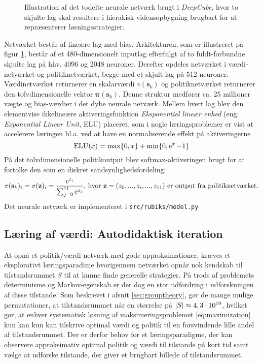 \documentclass[../main.tex]{subfiles}
\begin{document}
\begin{figure}[H]
	\centering

\caption{Illustration af det todelte neurale netværk brugt i \textit{DeepCube}, hvor to skjulte lag skal resultere i hierakisk vidensopbygning brugbart for at repræsenterer løsningsstrategier.}
\label{fig:DNN}
\end{figure}
\noindent Netværket består af lineære lag med bias.  Arkitekturen, som er illustreret på figur \ref{fig:DNN}, består af et 480-dimensionelt inputlag efterfulgt af to fuldt-forbundne skjulte lag på hhv. 4096 og 2048 neuroner. Derefter opdeles netværket i værdi-netværket og politiknetværket, begge med et skjult lag på 512 neuroner. Værdinetværket returnerer en skalarværdi \(v(\mathbf s_k)\) og politiknetværket returnerer den tolvdimensionelle vektor \(\bm \pi (\mathbf s_k)\). Denne struktur medfører ca. 25 millioner vægte og bias-værdier i det dybe neurale netværk. Mellem hvert lag blev den elementvise ikkelineære aktiveringsfunktion \textit{Eksponentiel lineær enhed} (eng: \textit{Exponential Linear Unit}, ELU) placeret, som i nogle læringsproblemer er vist at accelerere læringen bl.a. ved at have en normaliserende effekt på aktiveringerne \cite{ELU} 
\[
\operatorname{ELU}(x) = \operatorname*{max}\{0, x\} + \operatorname{min}\{0, \operatorname{e}^{x} -1\}
\]
På det tolvdimensionelle politikoutput blev softmax-aktiveringen brugt for at fortolke den som en diskret sandsynlighedsfordeling:
\[
\pi(\mathbf s_k)_i = \sigma(\mathbf z)_i = \frac{\operatorname{e}^{z_i}}{\sum_{j=0}^{11} \operatorname{e}^{z_j}} \text{, hvor \(\mathbf z=(z_0, ..., z_i, ..., z_{11})\) er output fra politiknetværket.}
\]
Det neurale netværk er implementeret i \texttt{src/rubiks/model.py}
\subsection*{Læring af værdi: Autodidaktisk iteration}
At opnå et politik/værdi-netværk med gode approksimationer, kræves et eksplorativt læringsparadime hvorigennem netværket opnår nok kendskab til tilstandsrummet \(S\) til at kunne finde generelle strategier. 
På trods af problemets determinisme og Markov-egenskab er der dog en stor udfordring i udforskningen af disse tilstande.
Som beskrevet i afsnit \ref{sec:grouptheory}, gør de mange mulige permutationer, at tilstandsrummet når en størrelse på \(|S|\approx 4,3\cdot10^{19}\), hvilket gør, at enhver systematisk løsning af maksimeringsproblemet \ref{eq:maximization} kun kan kun kan tilskrive optimal værdi og politik til en forsvindende lille andel af tilstandsrummet.
Der er derfor behov for et læringsparadigme, der kan observere approksimativ optimal politik og værdi til tilstande på kort tid samt vælge at udforske tilstande, der giver et brugbart billede af tilstandsrummet.
\end{document}
